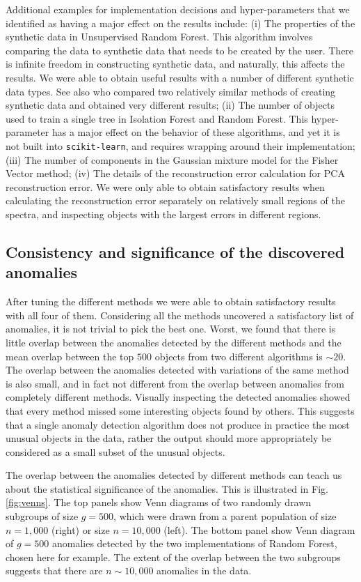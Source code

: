 \documentclass[fleqn,usenatbib]{mnras}
\newcommand{\sklearn}{\texttt{scikit-learn}}
\begin{document}
{Additional examples for implementation decisions and hyper-parameters  that we identified as having a major effect on the results include: (i) The properties of the synthetic data in Unsupervised Random Forest. This algorithm involves comparing the data to synthetic data that needs to be created by the user.  There is infinite freedom in constructing synthetic data, and naturally, this affects the results. We were able to obtain useful results with a number of different synthetic data types. See also \citet{shi06} who compared two relatively similar methods of creating synthetic data and obtained very different results; (ii) The number of objects used to train a single tree in Isolation Forest and Random Forest. This hyper-parameter has a major effect on the behavior of these algorithms, and yet it is not built into  \sklearn, and requires wrapping around their implementation; (iii) The number of components in the Gaussian mixture model for the Fisher Vector method; (iv) The details of the reconstruction error calculation for PCA reconstruction error. We were only able to obtain satisfactory results when calculating the reconstruction error separately on relatively small regions of the spectra, and inspecting objects with the largest errors in different regions.

\subsection{Consistency and significance of the discovered anomalies}

After tuning the different methods we were able to obtain satisfactory results with all four of them.  Considering all the methods uncovered a satisfactory list of anomalies, it is not trivial to pick the best one. Worst, we found that there is  little overlap between the anomalies detected  by the different methods and the mean overlap between the top $500$ objects from two different algorithms is $\sim 20$. The overlap between the anomalies detected with variations of the same method is also small, and in fact not different from the overlap between anomalies from completely different methods. Visually inspecting the detected anomalies showed that every method missed some interesting objects  found by others. This  suggests that a single anomaly detection algorithm does not produce in practice the most unusual objects in the data, rather the output should more appropriately  be considered as a small subset of the unusual objects. 

The overlap between the anomalies detected by  different methods can teach us about the statistical significance of the anomalies.  This is illustrated in Fig. \ref{fig:venns}. The top panels show Venn diagrams of two randomly drawn subgroups of size $g=500$, which were drawn from a parent population of size $n = 1,000$ (right) or size $n=10,000$ (left). The bottom panel show Venn diagram of  $g = 500$ anomalies detected by the two implementations of Random Forest, chosen here for example. The extent of the overlap between the two subgroups suggests that there are $n \sim 10,000$ anomalies in the data. 


}
\end{document}
